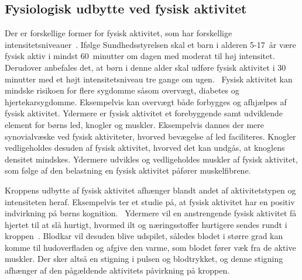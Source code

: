 \subsection{Fysiologisk udbytte ved fysisk aktivitet}\label{subsec:fysio_aktivitet}
Der er forskellige former for fysisk aktivitet, som har forskellige intensitetsniveauer~\citep{Academic2016a}. Ifølge Sundhedsstyrelsen skal et barn i alderen 5-17~år være fysisk aktiv i mindst 60~minutter om dagen med moderat til høj intensitet. Derudover anbefales det, at børn i denne alder skal udføre fysisk aktivitet i 30 minutter med et højt intensitetsniveau tre gange om ugen.~\citep{Sundhedsstyrelsen2016}\newline
Fysisk aktivitet kan mindske risikoen for flere sygdomme såsom overvægt, diabetes og hjertekarsygdomme. Eksempelvis kan overvægt både forbygges og afhjælpes af fysisk aktivitet. Ydermere er fysisk aktivitet et forebyggende samt udviklende element for børns led, knogler og muskler. Eksempelvis dannes der mere synovialvæske ved fysisk aktiviteter, hvorved bevægelse af led faciliteres. Knogler vedligeholdes desuden af fysisk aktivitet, hvorved det kan undgås, at knoglens densitet mindskes. Ydermere udvikles og vedligeholdes muskler af fysisk aktivitet, som følge af den belastning en fysisk aktivitet påfører muskelfibrene.~\citep{Smith1991,Academic2016b,CenterforDiseaseControlandPrevention2015}

Kroppens udbytte af fysisk aktivitet afhænger blandt andet af aktivitetstypen og intensiteten heraf. Eksempelvis ter et studie på, at fysisk aktivitet har en positiv indvirkning på børns kognition.~\citep{SibleyEtnier2003} Ydermere vil en anstrengende fysisk aktivitet få hjertet til at slå hurtigt, hvormed ilt og næringsstoffer hurtigere sendes rundt i kroppen~\citep{Hjerteforeningen}. Blodkar vil desuden blive udspilet, således blodet i større grad kan komme til hudoverfladen og afgive den varme, som blodet fører væk fra de aktive muskler. Der sker altså en stigning i pulsen og blodtrykket, og denne stigning afhænger af den pågældende aktivitets påvirkning på kroppen.~\citep{Martini2012,Stanfield2013,Berchtold2010}